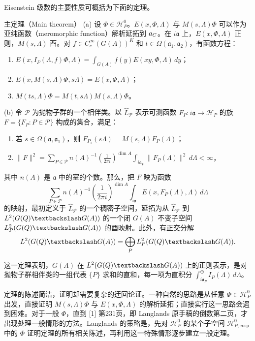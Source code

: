 Eisenstein 级数的主要性质可概括为下面的定理。
\begin{originaltheorem}{主定理（Main theorem）}
(a) 设 $\Phi\in\mathcal H_P^0$。$E(x,\Phi,\Lambda)$ 与 $M(s,\Lambda)\Phi$ 可以作为亚纯函数（meromorphic function）解析延拓到 $a_C$。在 $i\mathfrak a$ 上，$E(x,\Phi,\Lambda)$ 正则，$M(s,\Lambda)$ 酉。对 $f\in C_c^\infty(G(A))^K$ 和
$t\in\Omega(\mathfrak a_1,\mathfrak a_2)$，有函数方程：
\begin{enumerate}
\item[(i)] $\displaystyle E(x,I_P(\Lambda,f)\Phi,\Lambda)=\int_{G(A)}f(y)E(xy,\Phi,\Lambda)\,dy$；
\item[(ii)] $E(x,M(s,\Lambda)\Phi,s\Lambda)=E(x,\Phi,\Lambda)$；
\item[(iii)] $M(ts,\Lambda)\Phi=M(t,s\Lambda)M(s,\Lambda)\Phi$。
\end{enumerate}
(b) 令 $\mathcal P$ 为抛物子群的一个相伴类。以 $\widehat L_\mathcal P$ 表示可测函数
$F_P:i\mathfrak a\to\mathcal H_P$ 的族 $F=\{F_P:P\in\mathcal P\}$ 构成的集合，满足：
\begin{enumerate}
\item[(i)] 若 $s\in\Omega(\mathfrak a,\mathfrak a_1)$，则 $F_{P_1}(s\Lambda)=M(s,\Lambda)F_P(\Lambda)$；
\item[(ii)] $\displaystyle\|F\|^2=\sum_{P\in\mathcal P}n(A)^{-1}
 \left(\frac1{2\pi i}\right)^{\dim A}\int_{i\mathfrak a_P}\|F_P(\Lambda)\|^2\,d\Lambda<\infty$，
\end{enumerate}
其中 $n(A)$ 是 $\mathfrak a$ 中的室的个数。那么，把 $F$ 映为函数
\[
 \sum_{P\in\mathcal P}n(A)^{-1}\left(\frac1{2\pi i}\right)^{\dim A}
 \int_{i\mathfrak a}E(x,F_P(\Lambda),\Lambda)\,d\Lambda
\]
的映射，最初定义于 $\widehat L_\mathcal P$ 的一个稠密子空间，延拓为从 $\widehat L_\mathcal P$ 到
$L^2(G(\Q)\backslash G(A))$ 的一个闭 $G(A)$ 不变子空间
$L_\mathcal P^2(G(\Q)\backslash G(A))$ 的酉映射。此外，有正交分解
\[
 L^2(G(\Q)\backslash G(A))=\bigoplus_\mathcal P L_\mathcal P^2(G(\Q)\backslash G(A)).
\]
\end{originaltheorem}

这一定理表明，$G(A)$ 在 $L^2(G(\Q)\backslash G(A))$ 上的正则表示，是对抛物子群相伴类的一组代表 $\{P\}$ 求和的直和，每一项为直积分
$\int_{i\mathfrak a_P}^{\oplus}I_P(\Lambda)\,d\Lambda$。

定理的陈述简洁，证明却需要复杂的迂回论证。一种自然的思路是从任意 $\Phi\in\mathcal H_P^0$ 出发，直接证明 $M(s,\Lambda)\Phi$ 与 $E(x,\Phi,\Lambda)$ 的解析延拓；直接实行这一思路会遇到困难。对于一般 $\Phi$，直到 [1] 第231页，即 Langlands 原手稿的倒数第二页，才出现处理一般情形的方法。Langlands 的策略是，先对 $\mathcal H_P^0$ 的某个子空间 $\mathcal H_{P,\mathrm{cusp}}^0$ 中的 $\Phi$ 证明定理的所有相关陈述，再利用这一特殊情形逐步建立一般定理。

